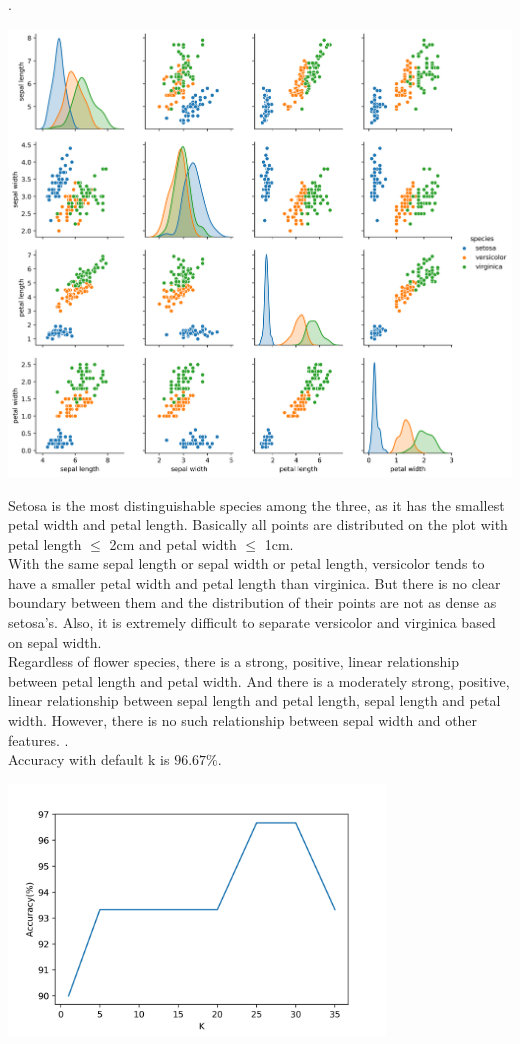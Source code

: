 \documentclass[12pt]{article}
\begin{document}
.
\begin{center}
    \includegraphics[width=17cm]{Q1.png}
\end{center}
Setosa is the most distinguishable species among the three, as it has the smallest petal width and petal length. Basically all points are distributed on the plot with petal length $\leq$ 2cm and petal width $\leq$ 1cm.\\
With the same sepal length or sepal width or petal length, versicolor tends to have a smaller petal width and petal length than virginica. But there is no clear boundary between them and the distribution of their points are not as dense as setosa's. Also, it is extremely difficult to separate versicolor and virginica based on sepal width.\\
Regardless of flower species, there is a strong, positive, linear relationship between petal length and petal width. And there is a moderately strong, positive, linear relationship between sepal length and petal length, sepal length and petal width. However, there is no such relationship between sepal width and other features.
\newpage
{}.\\
Accuracy with default k is $96.67\%$.
\begin{center}
    \includegraphics[width=10cm]{Q2.png}
\end{center}
\end{document}
